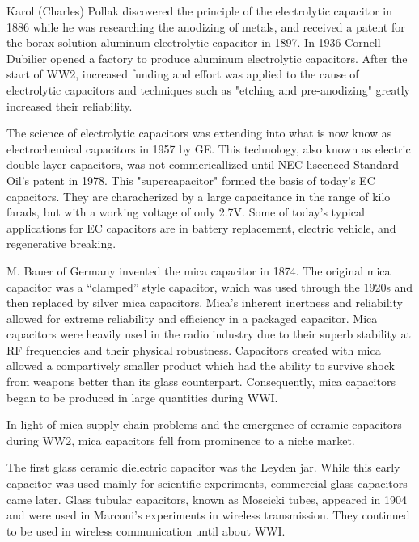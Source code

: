 Karol (Charles) Pollak discovered the principle of the electrolytic capacitor in 1886 while he was researching the anodizing of metals, and received a patent for the borax-solution aluminum electrolytic capacitor in 1897.  
In 1936 Cornell-Dubilier opened a factory to produce aluminum electrolytic capacitors. 
After the start of WW2, increased funding and effort was applied to the cause of electrolytic capacitors and techniques such as "etching and pre-anodizing" greatly increased their reliability.\cite{deis_hist}\cite{wiki_elec}

The science of electrolytic capacitors was extending into what is now know as electrochemical capacitors in 1957 by GE. This technology, also known as electric double layer capacitors, was not commericallized until NEC liscenced Standard Oil's patent in 1978.\cite{electrochem_intro} This "supercapacitor" formed the basis of today's EC capacitors. They are characherized by a large capacitance in the range of kilo farads, but with a working voltage of only 2.7V.\cite{electrochem_intro} Some of today's typical applications for EC capacitors are in battery replacement, electric vehicle, and regenerative breaking.

\nocite{hh}
\nocite{capGuide_mica}
M. Bauer of Germany invented the mica capacitor in 1874. The original mica capacitor was a ``clamped'' style capacitor, which was used through the 1920s\cite{wiki_mica} and then replaced by silver mica capacitors.\cite{learn_caps}
Mica's inherent inertness and reliability allowed for extreme reliability and efficiency in a packaged capacitor.\cite{tedds_mica} Mica capacitors were heavily used in the radio industry due to their superb stability at RF frequencies and their physical robustness.\cite{radio_mica}
Capacitors created with mica allowed a compartively smaller product\cite[f.~37-41]{dumInv} which had the ability to survive shock from weapons better than its glass counterpart. Consequently, mica capacitors began to be produced in large quantities during WWI.

In light of mica supply chain problems and the emergence of ceramic capacitors during WW2, mica capacitors fell from prominence to a niche market.\cite[Ch 3, Sec II]{cerMaterials}

The first glass ceramic dielectric capacitor was the Leyden jar. While this early capacitor was used mainly for scientific experiments, commercial glass capacitors came later. 
Glass tubular capacitors, known as Moscicki tubes, appeared in 1904 and were used in Marconi's experiments in wireless transmission. They continued to be used in wireless communication until about WWI. \cite[p.~102]{dumInv}

